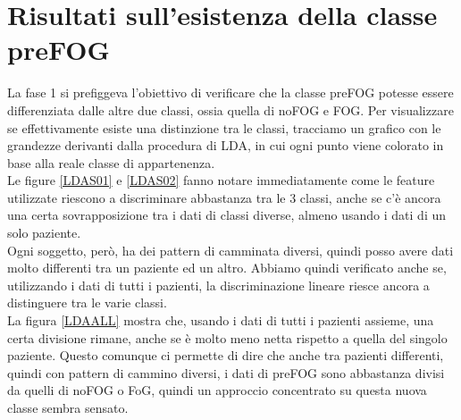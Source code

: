 \section{Risultati sull'esistenza della classe preFOG}
La fase 1 si prefiggeva l'obiettivo di verificare che la classe preFOG potesse essere differenziata dalle altre due classi, ossia quella di noFOG e FOG. Per visualizzare se effettivamente esiste una distinzione tra le classi, tracciamo un grafico con le grandezze derivanti dalla procedura di LDA, in cui ogni punto viene colorato in base alla reale classe di appartenenza.\\
Le figure \ref{LDAS01} e \ref{LDAS02} fanno notare immediatamente come le feature utilizzate riescono a discriminare abbastanza tra le 3 classi, anche se c'è ancora una certa sovrapposizione tra i dati di classi diverse, almeno usando i dati di un solo paziente.\\
Ogni soggetto, però, ha dei pattern di camminata diversi, quindi posso avere dati molto differenti tra un paziente ed un altro. Abbiamo quindi verificato anche se, utilizzando i dati di tutti i pazienti, la discriminazione lineare riesce ancora a distinguere tra le varie classi.\\
La figura \ref{LDAALL} mostra che, usando i dati di tutti i pazienti assieme, una certa divisione rimane, anche se è molto meno netta rispetto a quella del singolo paziente. Questo comunque ci permette di dire che anche tra pazienti differenti, quindi con pattern di cammino diversi, i dati di preFOG sono abbastanza divisi da quelli di noFOG o FoG, quindi un approccio concentrato su questa nuova classe sembra sensato.

